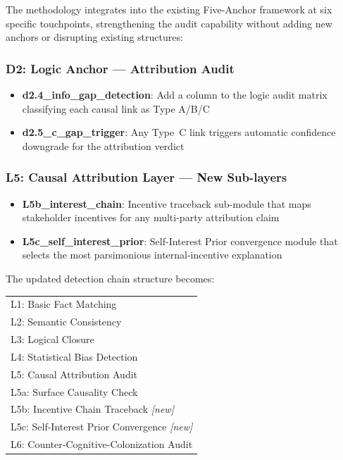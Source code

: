 The methodology integrates into the existing Five-Anchor framework at six 
specific touchpoints, strengthening the audit capability without adding new 
anchors or disrupting existing structures:

\subsubsection{D2: Logic Anchor --- Attribution Audit}

\begin{itemize}
  \item \textbf{d2.4\_info\_gap\_detection}: Add a column to the logic audit 
        matrix classifying each causal link as Type A/B/C
  \item \textbf{d2.5\_c\_gap\_trigger}: Any Type~C link triggers automatic 
        confidence downgrade for the attribution verdict
\end{itemize}

\subsubsection{L5: Causal Attribution Layer --- New Sub-layers}

\begin{itemize}
  \item \textbf{L5b\_interest\_chain}: Incentive traceback sub-module that maps 
        stakeholder incentives for any multi-party attribution claim
  \item \textbf{L5c\_self\_interest\_prior}: Self-Interest Prior convergence 
        module that selects the most parsimonious internal-incentive explanation
\end{itemize}

The updated detection chain structure becomes:

\begin{center}
\begin{tabular}{l}
L1: Basic Fact Matching \\
L2: Semantic Consistency \\
L3: Logical Closure \\
L4: Statistical Bias Detection \\
L5: Causal Attribution Audit \\
\quad L5a: Surface Causality Check \\
\quad L5b: Incentive Chain Traceback \hfill \textit{[new]} \\
\quad L5c: Self-Interest Prior Convergence \hfill \textit{[new]} \\
L6: Counter-Cognitive-Colonization Audit \\
\end{tabular}
\end{center}

